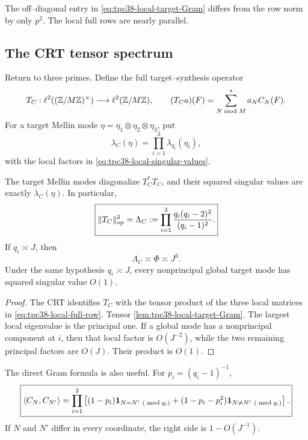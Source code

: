 The off--diagonal entry in \eqref{eq:tpc38-local-target-Gram} differs from
the row norm by only \(p^2\).  The local full rows are nearly parallel.

\subsection{The CRT tensor spectrum}

Return to three primes.  Define the full target--synthesis operator
\begin{equation}
 T_C:\ell^2((\mathbb Z/M\mathbb Z)^\times)\longrightarrow\ell^2(\mathbb Z/M\mathbb Z),
 \qquad
 (T_Ca)(F)=\sum_{N\bmod M}^{*}a_NC_N(F).
 \label{eq:tpc38-TC-definition}
\end{equation}
For a target Mellin mode
\(\eta=\eta_1\otimes\eta_2\otimes\eta_3\), put
\begin{equation}
 \lambda_C(\eta)=\prod_{i=1}^3\lambda_{q_i}(\eta_i),
 \label{eq:tpc38-lambda-C}
\end{equation}
with the local factors in \eqref{eq:tpc38-local-singular-values}.

\begin{theorem}
\label{thm:tpc38-full-target-spectrum}
The target Mellin modes diagonalize \(T_C^*T_C\), and their squared
singular values are exactly \(\lambda_C(\eta)\).  In particular,
\begin{equation}
 \boxed{
 \|T_C\|_{\operatorname{op}}^2
 =\Lambda_C
 :=\prod_{i=1}^3
 \frac{q_i(q_i-2)^2}{(q_i-1)^2}.}
 \label{eq:tpc38-TC-norm}
\end{equation}
If \(q_i\asymp J\), then
\begin{equation}
 \Lambda_C\asymp\Phi\asymp J^3.
 \label{eq:tpc38-TC-endpoint}
\end{equation}
Under the same hypothesis \(q_i\asymp J\), every nonprincipal global
target mode has squared singular value \(O(1)\).
\end{theorem}

\begin{proof}
The CRT identifies \(T_C\) with the tensor product of the three local
matrices in \eqref{eq:tpc38-local-full-row}.  Tensor
\cref{lem:tpc38-local-target-Gram}.  The largest local eigenvalue is the
principal one.  If a global mode has a nonprincipal component at \(i\),
then that local factor is \(O(J^{-2})\), while the two remaining principal
factors are \(O(J)\).  Their product is \(O(1)\).
\end{proof}

The direct Gram formula is also useful.  For \(p_i=(q_i-1)^{-1}\),
\begin{equation}
 \boxed{
 \langle C_N,C_{N'}\rangle
 =\prod_{i=1}^3
 \left[
 (1-p_i)\mathbf 1_{N=N'\ (\bmod q_i)}
 +(1-p_i-p_i^2)\mathbf 1_{N\ne N'\ (\bmod q_i)}
 \right].}
 \label{eq:tpc38-global-full-row-Gram}
\end{equation}
If \(N\) and \(N'\) differ in every coordinate, the right side is
\(1-O(J^{-1})\).

